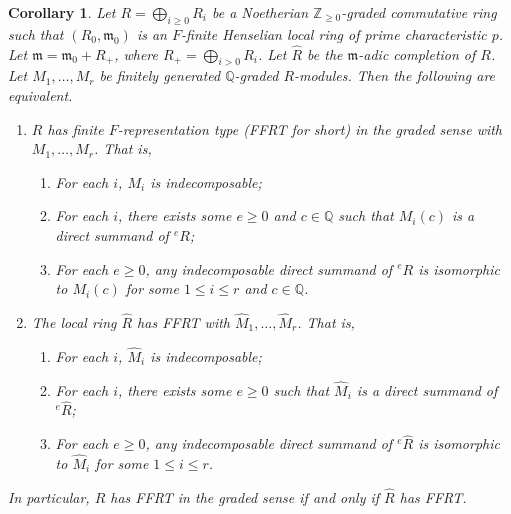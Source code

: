 \documentclass[11pt,leqno]{article}
\newtheorem{corollary}[theorem]{Corollary}
\theoremstyle{definition}
\theoremstyle{remark}
\theoremstyle{remark}
\def\({{\rm (}}
\def\){{\rm )}}
\newcommand{\fm}{\ensuremath{\mathfrak m}}
\def\({{\rm(}}
\def\){{\rm)}}
\def\fm{\mathfrak{m}}
\def\QQ{{\mathbb{Q}}}
\def\ZZ{{\mathbb{Z}}}
\begin{document}
\begin{corollary}\label{main2.cor}
  Let $R=\bigoplus_{i\geq 0}R_i$ be a Noetherian $\ZZ_{\geq 0}$-graded commutative ring such that
  $(R_0,\fm_0)$ is an $F$-finite Henselian local ring of prime characteristic $p$.
  Let $\fm=\fm_0+R_+$, where $R_+=\bigoplus_{i>0}R_i$.
  Let $\hat R$ be the $\fm$-adic completion of $R$.
  Let $M_1,\ldots,M_r$ be finitely generated $\QQ$-graded $R$-modules.
  Then the following are equivalent.
  \begin{enumerate}
  \item[\rm(1)] $R$ has finite $F$-representation type \(FFRT for short\) in the graded sense with $M_1,\ldots,M_r$.
    That is,
    \begin{enumerate}
      \item[\rm(1-a)] For each $i$, $M_i$ is indecomposable;
    \item[\rm(1-b)] For each $i$, there exists some $e\geq 0$ and $c\in\QQ$ such that $M_i(c)$ is a direct summand of 
      ${}^eR$;
    \item[\rm(1-c)] For each $e\geq 0$, any indecomposable direct summand of ${}^eR$ is
        isomorphic to $M_i(c)$ for some $1\leq i\leq r$ and $c\in\QQ$.
    \end{enumerate}
  \item[\rm(2)] The local ring $\hat R$ has FFRT with $\hat M_1,\ldots,\hat M_r$.
    That is,
\begin{enumerate}
\item[\rm(2-a)] For each $i$, $\hat M_i$ is indecomposable;
\item[\rm(2-b)]  For each $i$, there exists some $e\geq 0$ such that $\hat M_i$ is a direct summand of ${}^e\hat R$;
\item[\rm(2-c)] For each $e\geq 0$, any indecomposable direct summand of ${}^e\hat R$ is
  isomorphic to $\hat M_i$ for some $1\leq i\leq r$.
\end{enumerate}
  \end{enumerate}
  In particular, $R$ has FFRT in the graded sense if and only if $\hat R$ has FFRT.
\end{corollary}
\end{document}
